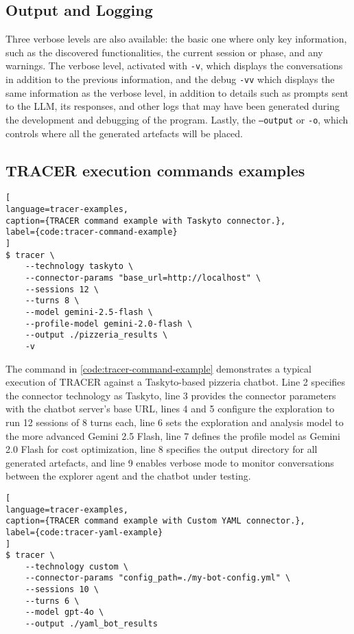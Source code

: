 \subsection{Output and Logging}

Three verbose levels are also available:
the basic one where only key information, such as the discovered functionalities,
the current session or phase, and any warnings.
The verbose level, activated with \texttt{-v},
which displays the conversations in addition to the previous information,
and the debug \texttt{-vv}
which displays the same information as the verbose level,
in addition to details such as prompts
sent to the \ac{LLM}, its responses,
and other logs that may have been generated
during the development and debugging of the program.
Lastly, the \texttt{--output} or \texttt{-o},
which controls where all the generated artefacts will be placed.

\subsection{TRACER execution commands examples}

\begin{lstlisting}[
language=tracer-examples,
caption={TRACER command example with Taskyto connector.},
label={code:tracer-command-example}
]
$ tracer \
    --technology taskyto \
    --connector-params "base_url=http://localhost" \
    --sessions 12 \
    --turns 8 \
    --model gemini-2.5-flash \
    --profile-model gemini-2.0-flash \
    --output ./pizzeria_results \
    -v
\end{lstlisting}

The command in \autoref{code:tracer-command-example}
demonstrates a typical execution of \ac{TRACER} against a Taskyto-based pizzeria chatbot.
Line 2 specifies the connector technology as Taskyto,
line 3 provides the connector parameters with the chatbot server's base URL,
lines 4 and 5 configure the exploration to run 12 sessions of 8 turns each,
line 6 sets the exploration and analysis model to the more advanced Gemini 2.5 Flash,
line 7 defines the profile model as Gemini 2.0 Flash for cost optimization,
line 8 specifies the output directory for all generated artefacts,
and line 9 enables verbose mode to monitor conversations
between the explorer agent and the chatbot under testing.

\begin{lstlisting}[
language=tracer-examples,
caption={TRACER command example with Custom YAML connector.},
label={code:tracer-yaml-example}
]
$ tracer \
    --technology custom \
    --connector-params "config_path=./my-bot-config.yml" \
    --sessions 10 \
    --turns 6 \
    --model gpt-4o \
    --output ./yaml_bot_results
\end{lstlisting}

